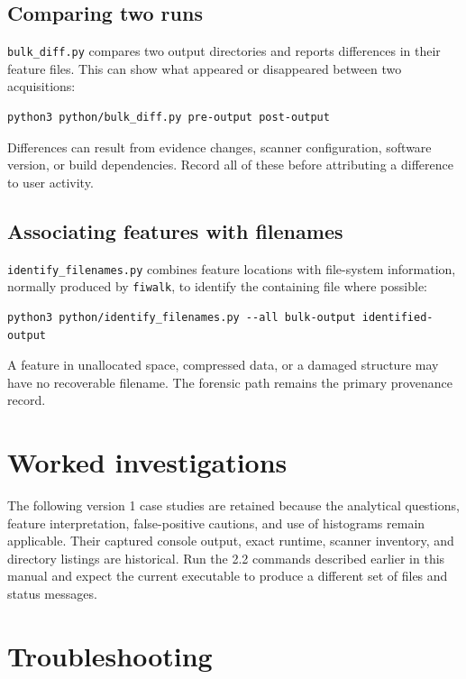 \documentclass[11pt]{article}
\newcommand{\code}[1]{\texttt{#1}}
\begin{document}
\subsection{Comparing two runs}

\code{bulk\_diff.py} compares two output directories and reports differences
in their feature files. This can show what appeared or disappeared between two
acquisitions:

\begin{Verbatim}
python3 python/bulk_diff.py pre-output post-output
\end{Verbatim}

Differences can result from evidence changes, scanner configuration, software
version, or build dependencies. Record all of these before attributing a
difference to user activity.

\subsection{Associating features with filenames}

\code{identify\_filenames.py} combines feature locations with file-system
information, normally produced by \code{fiwalk}, to identify the containing
file where possible:

\begin{Verbatim}
python3 python/identify_filenames.py --all bulk-output identified-output
\end{Verbatim}

A feature in unallocated space, compressed data, or a damaged structure may
have no recoverable filename. The forensic path remains the primary provenance
record.

\section{Worked investigations}
\label{sec:worked-examples}

The following version 1 case studies are retained because the analytical
questions, feature interpretation, false-positive cautions, and use of
histograms remain applicable. Their captured console output, exact runtime,
scanner inventory, and directory listings are historical. Run the 2.2 commands
described earlier in this manual and expect the current executable to produce a
different set of files and status messages.

\begingroup
\sloppy

\endgroup

\section{Troubleshooting}
\end{document}
